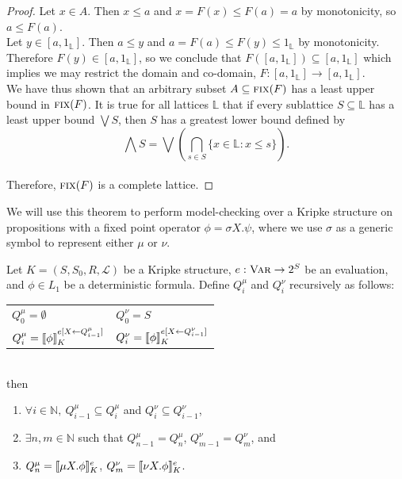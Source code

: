 \begin{proof}
    Let $x \in A$. Then $x \leq a$ and $x = F(x) \leq F(a) = a$ by monotonicity, so $a \leq F(a)$.\\
    Let $y \in [a,1_\mathbb{L}]$. Then $a \leq y$ and $a = F(a) \leq F(y) \leq 1_\mathbb{L}$ by monotonicity.\\
    Therefore $F(y) \in [a,1_\mathbb{L}]$, so we conclude that $F([a,1_\mathbb{L}]) \subseteq [a,1_\mathbb{L}]$ which implies we may restrict the domain and co-domain, $F: [a,1_\mathbb{L}] \to [a,1_\mathbb{L}]$.\\
    We have thus shown that an arbitrary subset $A \subseteq \textsc{fix}(F)$ has a least upper bound in $\textsc{fix}(F)$. It is true for all lattices $\mathbb{L}$ that if every sublattice $S \subseteq \mathbb{L}$ has a least upper bound $\bigvee S$, then $S$ has a greatest lower bound defined by $$\bigwedge S = \bigvee \left( \bigcap\limits_{s \in S} \{ x \in \mathbb{L}: x \leq s \} \right).$$\\
    Therefore, $\textsc{fix}(F)$ is a complete lattice.
\end{proof}

We will use this theorem to perform model-checking over a Kripke structure on propositions with a fixed point operator $\phi = \sigma X.\psi$, where we use $\sigma$ as a generic symbol to represent either $\mu$ or $\nu$.

\begin{cor}\label{cor:tarskialg}
    Let $K = (S,S_0,R,\mathcal{L})$ be a Kripke structure, $e: \textsc{Var} \to 2^S$ be an evaluation, and $\phi \in L_1$ be a deterministic \mucalc{} formula. Define $Q_i^\mu$ and $Q_i^\nu$ recursively as follows:
    \vspace{2mm}\\
    \begin{tabular}{l | l}
        $Q_0^\mu = \emptyset$   
            & $Q_0^\nu = S$\\
        $Q_i^\mu = {\llbracket}{} \phi {\rrbracket}{}_K^{e[X \leftarrow Q_{i-1}^\mu]}$ 
            & $Q_i^\nu = {\llbracket}{} \phi {\rrbracket}{}_K^{e[X \leftarrow Q_{i-1}^\nu]}$
    \end{tabular}\\

    \noindent then 
    \begin{enumerate}[label = (\roman*)]   
        \item $\forall i \in \mathbb{N},\ Q_{i-1}^\mu \subseteq Q_i^\mu$ and $Q_i^\nu \subseteq Q_{i-1}^\nu$,
        \item $\exists n,m \in \mathbb{N}$ such that $Q_{n-1}^\mu = Q_n^\mu$, $Q_{m-1}^\nu = Q_m^\nu$, and
        \item $Q_n^\mu = {\llbracket}{} \mu X.\phi {\rrbracket}{}_K^e$, $Q_m^\nu = {\llbracket}{} \nu X.\phi {\rrbracket}{}_K^e$.
    \end{enumerate}
\end{cor}


